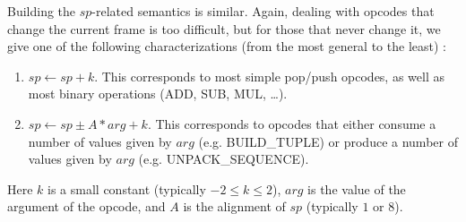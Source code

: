 \documentclass[english]{article}
\begin{document}
Building the $sp$-related semantics is similar. Again, dealing with opcodes that change the current frame is too difficult, but for those that never change it, we give one of the following characterizations (from the most general to the least) :
\begin{enumerate}
	\item $sp \leftarrow sp + k$. This corresponds to most simple pop/push opcodes, as well as most binary operations (ADD, SUB, MUL, \dots).
	\item $sp \leftarrow sp \pm A*arg + k$. This corresponds to opcodes that either consume a number of values given by $arg$ (e.g. BUILD\_TUPLE) or produce a number of values given by $arg$ (e.g. UNPACK\_SEQUENCE).
\end{enumerate}
Here $k$ is a small constant (typically $-2 \leq k \leq 2$), $arg$ is the value of the argument of the opcode, and $A$ is the alignment of $sp$ (typically $1$ or $8$).
\end{document}
